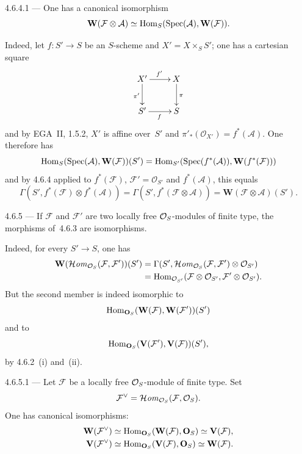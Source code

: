 \begin{corollary}{4.6.4.1}\label{I.4.6.4.1}
--- One has a canonical isomorphism
\[
\mathbf{W}(\mathcal{F} \otimes \mathcal{A}) \simeq \operatorname{Hom}_S(\operatorname{Spec}(\mathcal{A}), \mathbf{W}(\mathcal{F})).
\]
\end{corollary}

Indeed,%
{\renewcommand{\thefootnote}{(35)}}
let \(f \colon S' \to S\) be an \(S\)-scheme and \(X' = X \times_S S'\); one has a cartesian square
\[
\xymatrix{
X' \ar[r]^{f'} \ar[d]_{\pi'} & X \ar[d]^{\pi} \\
S' \ar[r]_{f} & S
}
\]
and by EGA~II, 1.5.2, \(X'\) is affine over~\(S'\) and \(\pi'_*(\mathcal{O}_{X'}) = f^*(\mathcal{A})\). One therefore has
\[
\operatorname{Hom}_S(\operatorname{Spec}(\mathcal{A}), \mathbf{W}(\mathcal{F}))(S') = \operatorname{Hom}_{S'}(\operatorname{Spec}(f^*(\mathcal{A})), \mathbf{W}(f^*(\mathcal{F})))
\]
and by 4.6.4 applied to \(f^*(\mathcal{F})\), \(\mathcal{F}' = \mathcal{O}_{S'}\) and \(f^*(\mathcal{A})\), this equals
\[
\Gamma(S', f^*(\mathcal{F}) \otimes f^*(\mathcal{A})) = \Gamma(S', f^*(\mathcal{F} \otimes \mathcal{A})) = \mathbf{W}(\mathcal{F} \otimes \mathcal{A})(S').
\]

\begin{proposition}{4.6.5}\label{I.4.6.5}
--- If \(\mathcal{F}\) and \(\mathcal{F}'\) are two locally free \(\mathcal{O}_S\)-modules of finite type, the morphisms of~4.6.3 are isomorphisms.
\end{proposition}

Indeed, for every \(S' \to S\), one has
\[
\begin{aligned}
\mathbf{W}(\mathcal{H}\mathit{om}_{\mathcal{O}_S}(\mathcal{F}, \mathcal{F}'))(S')
 &= \Gamma(S', \mathcal{H}\mathit{om}_{\mathcal{O}_S}(\mathcal{F}, \mathcal{F}') \otimes \mathcal{O}_{S'})\\
 &= \operatorname{Hom}_{\mathcal{O}_{S'}}(\mathcal{F} \otimes \mathcal{O}_{S'}, \mathcal{F}' \otimes \mathcal{O}_{S'}).
\end{aligned}
\]
But the second member is indeed isomorphic to
\[
\operatorname{Hom}_{\mathbf{O}_S}(\mathbf{W}(\mathcal{F}), \mathbf{W}(\mathcal{F}'))(S')
\]
and to
\[
\operatorname{Hom}_{\mathbf{O}_S}(\mathbf{V}(\mathcal{F}'), \mathbf{V}(\mathcal{F}))(S'),
\]
by 4.6.2~(i) and~(ii).

\begin{corollary}{4.6.5.1}\label{I.4.6.5.1}
--- Let \(\mathcal{F}\) be a locally free \(\mathcal{O}_S\)-module of finite type. Set
\[
\mathcal{F}^{\vee} = \mathcal{H}\mathit{om}_{\mathcal{O}_S}(\mathcal{F}, \mathcal{O}_S).
\]
One has canonical isomorphisms:
\begin{align*}
\mathbf{W}(\mathcal{F}^{\vee}) &\simeq \operatorname{Hom}_{\mathbf{O}_S}(\mathbf{W}(\mathcal{F}), \mathbf{O}_S) \simeq \mathbf{V}(\mathcal{F}), \\
\mathbf{V}(\mathcal{F}^{\vee}) &\simeq \operatorname{Hom}_{\mathbf{O}_S}(\mathbf{V}(\mathcal{F}), \mathbf{O}_S) \simeq \mathbf{W}(\mathcal{F}).
\end{align*}
\end{corollary}

